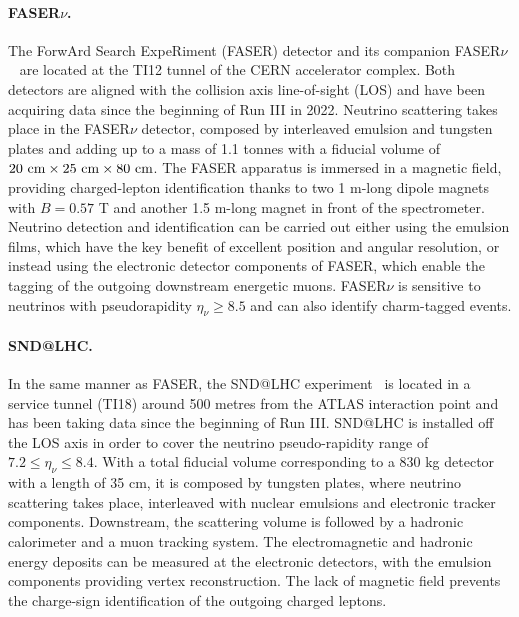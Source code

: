 \paragraph{FASER$\nu$.}
%
The ForwArd Search ExpeRiment (FASER) detector
and its companion FASER$\nu$~\cite{FASER:2019aik,FASER:2019dxq,FASER:2023zcr,FASER:2022hcn}
are located at the TI12 tunnel of the CERN accelerator complex.
%
Both detectors are aligned
with the collision axis line-of-sight (LOS)
and have been acquiring data since the beginning of Run III in 2022.
%
Neutrino scattering takes place in the FASER$\nu$ 
detector, composed by interleaved emulsion and tungsten plates and
adding up to a mass of 1.1 tonnes with a fiducial volume of $20~\rm{cm} \times 25~\rm{cm} \times 80~{\rm cm}$.
%
The FASER apparatus is immersed in a magnetic field,  providing charged-lepton
identification thanks to two 1 m-long dipole magnets with $B=0.57$ T
and another 1.5 m-long magnet in front of the spectrometer. 
%
Neutrino detection and identification can be carried out either using the emulsion
films, which have the key benefit of excellent position and angular resolution,
or instead using the electronic detector components of FASER, which enable the tagging
of the outgoing downstream energetic muons.
%
FASER$\nu$ is sensitive to neutrinos with pseudorapidity $\eta_\nu \ge 8.5$
and can also identify charm-tagged events.


\paragraph{SND@LHC.}
%
In the same manner as FASER, the SND@LHC experiment~\cite{SNDLHC:2022ihg}
is located in a service tunnel (TI18)
around 500 metres from the ATLAS interaction point and has been taking data
since the  beginning of Run III.
%
SND@LHC is installed off the LOS axis in order to cover the neutrino
pseudo-rapidity range of $7.2 \le \eta_\nu \le 8.4$.
%
With a total fiducial volume corresponding to a 830 kg detector with a length of 35 cm, it is composed by tungsten plates,
where neutrino scattering takes place, interleaved with nuclear emulsions and electronic tracker
components.
%
Downstream, the scattering volume is followed by a hadronic calorimeter and a muon tracking system.
%
The electromagnetic
 and hadronic energy deposits can be measured at the electronic detectors, with the emulsion
 components providing vertex reconstruction.
 The lack of magnetic field prevents the charge-sign identification of the outgoing charged leptons.

